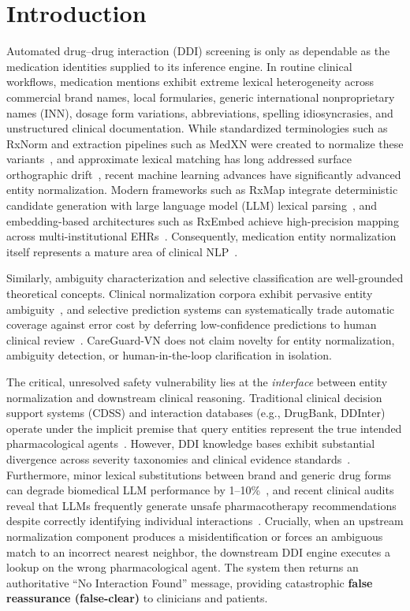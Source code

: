 \documentclass[11pt]{article}
\begin{document}
\section{Introduction}
Automated drug--drug interaction (DDI) screening is only as dependable as the medication identities supplied to its inference engine. In routine clinical workflows, medication mentions exhibit extreme lexical heterogeneity across commercial brand names, local formularies, generic international nonproprietary names (INN), dosage form variations, abbreviations, spelling idiosyncrasies, and unstructured clinical documentation. While standardized terminologies such as RxNorm and extraction pipelines such as MedXN were created to normalize these variants~\cite{nelson2011rxnorm,sohn2014medxn}, and approximate lexical matching has long addressed surface orthographic drift~\cite{peters2011approx}, recent machine learning advances have significantly advanced entity normalization. Modern frameworks such as RxMap integrate deterministic candidate generation with large language model (LLM) lexical parsing~\cite{korpela2026rxmap}, and embedding-based architectures such as RxEmbed achieve high-precision mapping across multi-institutional EHRs~\cite{huser2025rxembed}. Consequently, medication entity normalization itself represents a mature area of clinical NLP~\cite{chen2026mcnsurvey}.

Similarly, ambiguity characterization and selective classification are well-grounded theoretical concepts. Clinical normalization corpora exhibit pervasive entity ambiguity~\cite{newmangriffis2021ambiguity}, and selective prediction systems can systematically trade automatic coverage against error cost by deferring low-confidence predictions to human clinical review~\cite{swaminathan2024selective}. CareGuard-VN does not claim novelty for entity normalization, ambiguity detection, or human-in-the-loop clarification in isolation.

The critical, unresolved safety vulnerability lies at the \emph{interface} between entity normalization and downstream clinical reasoning. Traditional clinical decision support systems (CDSS) and interaction databases (e.g., DrugBank, DDInter) operate under the implicit premise that query entities represent the true intended pharmacological agents~\cite{wishart2018drugbank,tian2025ddinter}. However, DDI knowledge bases exhibit substantial divergence across severity taxonomies and clinical evidence standards~\cite{gibson2026ddireview}. Furthermore, minor lexical substitutions between brand and generic drug forms can degrade biomedical LLM performance by 1--10\%~\cite{gallifant2024rabbits}, and recent clinical audits reveal that LLMs frequently generate unsafe pharmacotherapy recommendations despite correctly identifying individual interactions~\cite{chase2026ddi}. Crucially, when an upstream normalization component produces a misidentification or forces an ambiguous match to an incorrect nearest neighbor, the downstream DDI engine executes a lookup on the wrong pharmacological agent. The system then returns an authoritative ``No Interaction Found'' message, providing catastrophic \textbf{false reassurance (false-clear)} to clinicians and patients.
\end{document}
